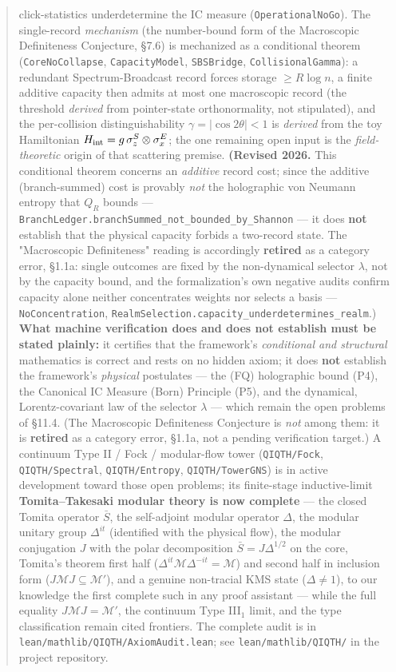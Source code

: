 \documentclass[11pt,a4paper]{article}
\begin{document}
\begin{abstract}
click-statistics underdetermine the IC measure (\texttt{OperationalNoGo}). The single-record \emph{mechanism} (the number-bound form of the Macroscopic Definiteness Conjecture, §7.6) is mechanized as a conditional theorem (\texttt{CoreNoCollapse}, \texttt{CapacityModel}, \texttt{SBSBridge}, \texttt{CollisionalGamma}): a redundant Spectrum-Broadcast record forces storage $\ge R\log n$, a finite additive capacity then admits at most one macroscopic record (the threshold \emph{derived} from pointer-state orthonormality, not stipulated), and the per-collision distinguishability $\gamma = |\cos 2\theta| < 1$ is \emph{derived} from the toy Hamiltonian $H_{\rm int}=g\,\sigma_z^S\otimes\sigma_x^E$; the one remaining open input is the \emph{field-theoretic} origin of that scattering premise. \textbf{(Revised 2026.} This conditional theorem concerns an \emph{additive} record cost; since the additive (branch-summed) cost is provably \emph{not} the holographic von Neumann entropy that $Q_R$ bounds — \texttt{BranchLedger.branchSummed\_not\_bounded\_by\_Shannon} — it does \textbf{not} establish that the physical capacity forbids a two-record state. The "Macroscopic Definiteness" reading is accordingly \textbf{retired} as a category error, §1.1a: single outcomes are fixed by the non-dynamical selector $\lambda$, not by the capacity bound, and the formalization's own negative audits confirm capacity alone neither concentrates weights nor selects a basis — \texttt{NoConcentration}, \texttt{RealmSelection.capacity\_underdetermines\_realm}.)\textbf{ What machine verification does and does not establish must be stated plainly:} it certifies that the framework's \emph{conditional and structural} mathematics is correct and rests on no hidden axiom; it does \textbf{not} establish the framework's \emph{physical} postulates — the (FQ) holographic bound (P4), the Canonical IC Measure (Born) Principle (P5), and the dynamical, Lorentz-covariant law of the selector $\lambda$ — which remain the open problems of §11.4. (The Macroscopic Definiteness Conjecture is \emph{not} among them: it is \textbf{retired} as a category error, §1.1a, not a pending verification target.) A continuum Type II / Fock / modular-flow tower (\texttt{QIQTH/Fock}, \texttt{QIQTH/Spectral}, \texttt{QIQTH/Entropy}, \texttt{QIQTH/TowerGNS}) is in active development toward those open problems; its finite-stage inductive-limit \textbf{Tomita–Takesaki modular theory is now complete} — the closed Tomita operator $\bar S$, the self-adjoint modular operator $\Delta$, the modular unitary group $\Delta^{it}$ (identified with the physical flow), the modular conjugation $J$ with the polar decomposition $\bar S = J\Delta^{1/2}$ on the core, Tomita's theorem first half ($\Delta^{it}\mathcal{M}\Delta^{-it}=\mathcal{M}$) and second half in inclusion form ($J\mathcal{M}J\subseteq\mathcal{M}'$), and a genuine non-tracial KMS state ($\Delta\neq 1$), to our knowledge the first complete such in any proof assistant — while the full equality $J\mathcal{M}J=\mathcal{M}'$, the continuum Type III$_1$ limit, and the type classification remain cited frontiers. The complete audit is in \texttt{lean/mathlib/QIQTH/AxiomAudit.lean}; see \texttt{lean/mathlib/QIQTH/} in the project repository.
\end{abstract}
\end{document}
